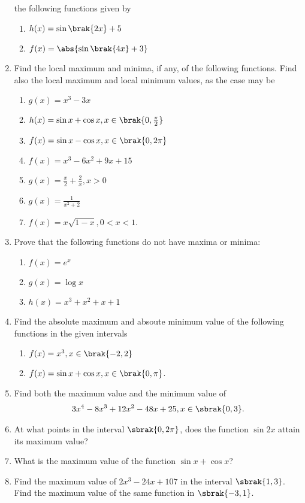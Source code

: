\begin{enumerate}[label=\arabic*.,ref=\thesubsection.\theenumi]
the following functions given by 
%
\begin{enumerate}
\item $h(x) = \sin\brak{2x} + 5$
\item $f(x) = \abs{\sin\brak{4x} + 3}$
\end{enumerate}
%
\item Find the local maximum and minima, if any, of
the following functions.  Find also the  local maximum and local minimum values, as the case may be
%
\begin{enumerate}
\item $g(x) = x^3-3x$
\item $h(x) = \sin x +\cos x, x \in \brak{0,\frac{\pi}{2}}$
\item $f(x) = \sin x -\cos x, x \in \brak{0,2\pi}$
\item $f(x) = x^3-6x^2+9x+15$
\item $g(x) = \frac{x}{2} + \frac{2}{x}, x > 0$
\item $g(x) = \frac{1}{x^2+2}$
\item $f(x) = x\sqrt{1-x}, 0 < x < 1$.
\end{enumerate}
%
\item Prove that the following functions do not have maxima or minima:
%
\begin{enumerate}
\item $f(x) = e^x$
\item $g(x) = \log x$
\item $h(x) = x^3+x^2+x+1$
\end{enumerate}
\item Find the absolute maximum and absoute minimum value of the following functions in the given intervals
%
\begin{enumerate}
\item $f(x) = x^3, x \in \brak{-2,2}$
\item $f(x) = \sin x + \cos x,  x \in \brak{0,\pi}$.
\end{enumerate}
%
\item Find both the maximum value and the minimum value of 
\begin{align}
3x^4-8x^3+12x^2-48x+25, x \in \sbrak{0,3}.
\end{align}
%
\item At what points in the interval $\sbrak{0,2\pi}$, does the function $\sin 2x$ attain its maximum value?
\item What is the maximum value of the function $\sin x + \cos x$?
\item Find the maximum value of $2x^3-24x+107$ in the interval $\sbrak{1,3}$.  Find the maximum value of the same function in $\sbrak{-3,1}$.

\end{enumerate}

